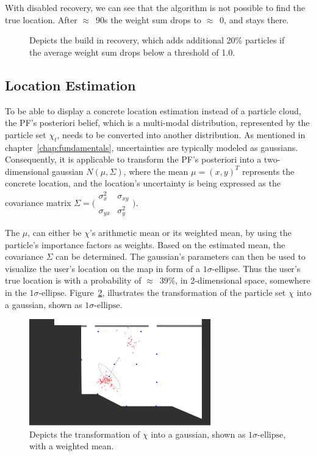 With disabled recovery, we can see that the algorithm is not possible to find the true location. After $\approx$~90s the weight sum drops to $\approx$~0, and stays there.




\begin{figure}
	
	\caption {Depicts the build in recovery, which adds additional 20\% particles if the average weight sum drops below a threshold of 1.0.}
	\label{fig:algo_recovery}
\end{figure}

\subsection{Location Estimation}\label{sec:algo_locEstimation}
To be able to display a concrete location estimation instead of a particle cloud, the \acs{PF}'s posteriori belief, which is a multi-modal distribution, represented by the particle set $\chi_t$, needs to be converted into another distribution. As mentioned in chapter~\ref{chap:fundamentals}, uncertainties are typically modeled as gaussians. Consequently, it is applicable to transform the \acs{PF}'s posteriori into a two-dimensional gaussian $N(\mu, \Sigma)$, where the mean $\mu = (x, y)^T$ represents the concrete location, and the location's uncertainty is being expressed as the covariance matrix $\Sigma = \bigl(\begin{smallmatrix} \sigma_{x}^2&\sigma_{xy}\\ \sigma_{yx}&\sigma_{y}^2 \end{smallmatrix} \bigr)$.

The $\mu$, can either be $\chi$'s arithmetic mean or its weighted mean, by using the particle's importance factors as weights. Based on the estimated mean, the covariance $\Sigma$ can be determined. The gaussian's parameters can then be used to visualize the user's location on the map in form of a $1\sigma\text{-ellipse}$. Thus the user's true location is with a probability of $\approx$~39\%, in 2-dimensional space, somewhere in the $1\sigma\text{-ellipse}$. Figure~\ref{fig:algo_sigellipse}, illustrates the transformation of the particle set $\chi$ into a gaussian, shown as $1\sigma\text{-ellipse}$.

\begin{figure}
	\includegraphics[width=0.7\textwidth]{figures/sigellipse}
	\caption{Depicts the transformation of $\chi$ into a gaussian, shown as $1\sigma\text{-ellipse}$, with a weighted mean.}
	\label{fig:algo_sigellipse}
\end{figure}
